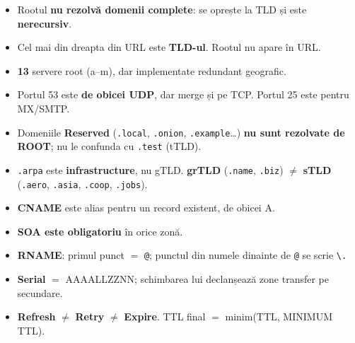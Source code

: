 \documentclass[11pt,a4paper]{article}
\newcommand{\cod}[1]{\texttt{#1}}
\begin{document}
\begin{capcana}
\begin{itemize}
  \item Rootul \textbf{nu rezolvă domenii complete}: se oprește la TLD și este \textbf{nerecursiv}.
  \item Cel mai din dreapta din URL este \textbf{TLD-ul}. Rootul nu apare în URL.
  \item \textbf{13} servere root (a--m), dar implementate redundant geografic.
  \item Portul 53 este \textbf{de obicei UDP}, dar merge și pe TCP. Portul 25 este pentru MX/SMTP.
  \item Domeniile \textbf{Reserved} (\cod{.local}, \cod{.onion}, \cod{.example}\ldots) \textbf{nu sunt rezolvate de ROOT}; nu le confunda cu \cod{.test} (tTLD).
  \item \cod{.arpa} este \textbf{infrastructure}, nu gTLD. \textbf{grTLD} (\cod{.name}, \cod{.biz}) $\neq$ \textbf{sTLD} (\cod{.aero}, \cod{.asia}, \cod{.coop}, \cod{.jobs}).
  \item \textbf{CNAME} este alias pentru un record existent, de obicei A.
  \item \textbf{SOA este obligatoriu} în orice zonă.
  \item \textbf{RNAME}: primul punct $=$ \cod{@}; punctul din numele dinainte de \cod{@} se scrie \cod{\textbackslash.}
  \item \textbf{Serial} $=$ AAAALLZZNN; schimbarea lui declanșează zone transfer pe secundare.
  \item \textbf{Refresh} $\neq$ \textbf{Retry} $\neq$ \textbf{Expire}. TTL final $=$ minim(TTL, MINIMUM TTL).
\end{itemize}
\end{capcana}
\end{document}

